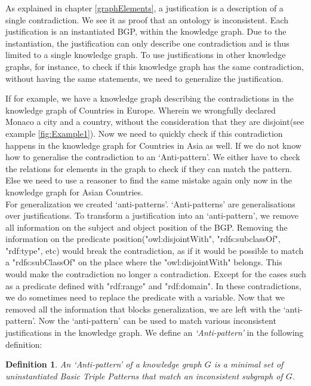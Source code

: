 \documentclass[11pt,letterpaper ,oneside ]{book}
\newtheorem{definition}{Definition}
\begin{document}
	As explained in chapter \ref{graphElements}, a justification is a description of a single contradiction. We see it as proof that an ontology is inconsistent. Each justification is an instantiated BGP, within the knowledge graph. Due to the instantiation, the justification can only describe one contradiction and is thus limited to a single knowledge graph. To use justifications in other knowledge graphs, for instance, to check if this knowledge graph has the same contradiction, without having the same statements, we need to generalize the justification.
	
	If for example, we have a knowledge graph describing the contradictions in the knowledge graph of Countries in Europe. Wherein we wrongfully declared Monaco a city and a country, without the consideration that they are disjoint(see example \ref{fig:Example1}). Now we need to quickly check if this contradiction happens in the knowledge graph for Countries in Asia as well. If we do not know how to generalise the contradiction to an `Anti-pattern'. We either have to check the relations for elements in the graph to check if they can match the pattern. Else we need to use a reasoner to find the same mistake again only now in the knowledge graph for Asian Countries.\\
	
	For generalization we created `anti-patterns'. `Anti-patterns' are generalisations over justifications. To transform a justification into an `anti-pattern', we remove all information on the subject and object position of the BGP. Removing the information on the predicate position("owl:disjointWith", "rdfs:subclassOf", "rdf:type", etc) would break the contradiction, as if it would be possible to match a "rdfs:subClassOf" on the place where the "owl:disjointWith" belongs. This would make the contradiction no longer a contradiction. Except for the cases such as a predicate defined with "rdf:range" and "rdf:domain". In these contradictions, we do sometimes need to replace the predicate with a variable. 
	Now that we removed all the information that blocks generalization, we are left with the `anti-pattern'. Now the `anti-pattern' can be used to match various inconsistent justifications in the knowledge graph. We define an \textit{`Anti-pattern'} in the following definition:\\
	
	\begin{definition} 
		An \textit{`Anti-pattern'} of a knowledge graph $G$ is a minimal set of uninstantiated Basic Triple Patterns that match an inconsistent subgraph of $G$.
	\end{definition}
	
\end{document}
